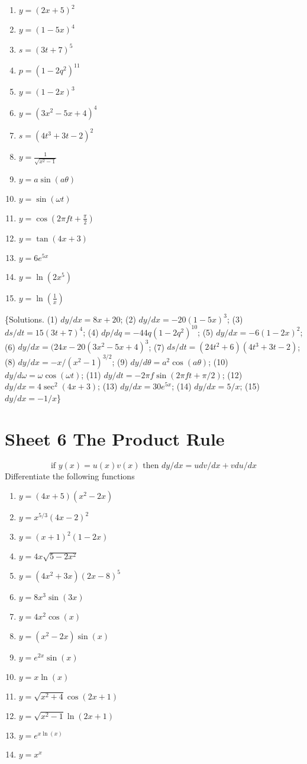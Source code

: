 \documentclass[
  english,
  11pt,
  oneside]{book}
\providecommand{\tightlist}{%
  \setlength{\itemsep}{0pt}\setlength{\parskip}{0pt}}
\newcommand{\slide}{}
\theoremstyle{definition}
\theoremstyle{definition}
\theoremstyle{definition}
\theoremstyle{definition}
\theoremstyle{remark}
\begin{document}
\begin{enumerate}
\def\labelenumi{\arabic{enumi}.}
\tightlist
\item
  \(y=(2x+5)^2\)
\item
  \(y=(1-5x)^4\)
\item
  \(s=(3t+7)^5\)
\item
  \(p=(1-2q^2)^{11}\)
\item
  \(y=(1-2x)^3\)
\item
  \(y=(3x^2-5x+4)^4\)
\item
  \(s=(4t^3+3t-2)^2\)
\item
  \(y=\frac1{\sqrt{x^2-1}}\)
\item
  \(y=a\sin(a\theta)\)
\item
  \(y=\sin(\omega t)\)
\item
  \(y=\cos(2\pi ft+\frac{\pi}2)\)
\item
  \(y=\tan(4x+3)\)
\item
  \(y=6e^{5x}\)
\item
  \(y=\ln(2x^5)\)
\item
  \(y=\ln(\frac 1x)\)
\end{enumerate}

\slide

\{Solutions. (1) \(dy/dx=8x+20\); (2) \(dy/dx=-20(1-5x)^3\); (3) \(ds/dt=15(3t+7)^4\); (4) \(dp/dq=-44q(1-2q^2)^{10}\); (5) \(dy/dx=-6(1-2x)^2\); (6) \(dy/dx=(24x-20(3x^2-5x+4)^3\); (7) \(ds/dt=(24t^2+6)(4t^3+3t-2)\); (8) \(dy/dx=-x/(x^2-1)^{3/2}\); (9) \(dy/d\theta=a^2\cos(a\theta)\); (10) \(dy/d\omega=\omega\cos(\omega t)\); (11) \(dy/dt=-2\pi f\sin(2\pi ft+\pi/2)\); (12) \(dy/dx=4\sec^2(4x+3)\); (13) \(dy/dx=30e^{5x}\); (14) \(dy/dx=5/x\); (15) \(dy/dx=-1/x\)\}
\slide

\section{Sheet 6 The Product Rule}\label{sheet-6-the-product-rule}

\[
\text{if }y(x)=u(x)v(x)\text{ then }dy/dx=udv/dx+vdu/dx
\]
Differentiate the following functions

\begin{enumerate}
\def\labelenumi{\arabic{enumi}.}
\tightlist
\item
  \(y=(4x+5)(x^2-2x)\)
\item
  \(y=x^{5/3}(4x-2)^2\)
\item
  \(y=(x+1)^2(1-2x)\)
\item
  \(y=4x\sqrt{5-2x^2}\)
\item
  \(y=(4x^2+3x)(2x-8)^5\)
\item
  \(y=8x^3\sin(3x)\)
\item
  \(y=4x^2\cos(x)\)
\item
  \(y=(x^2-2x)\sin(x)\)
\item
  \(y=e^{2x}\sin(x)\)
\item
  \(y=x\ln(x)\)
\item
  \(y=\sqrt{x^2+4}\cos(2x+1)\)
\item
  \(y=\sqrt{x^2-1}\ln(2x+1)\)
\item
  \(y=e^{x\ln(x)}\)
\item
  \(y=x^x\)
\end{enumerate}
\end{document}
